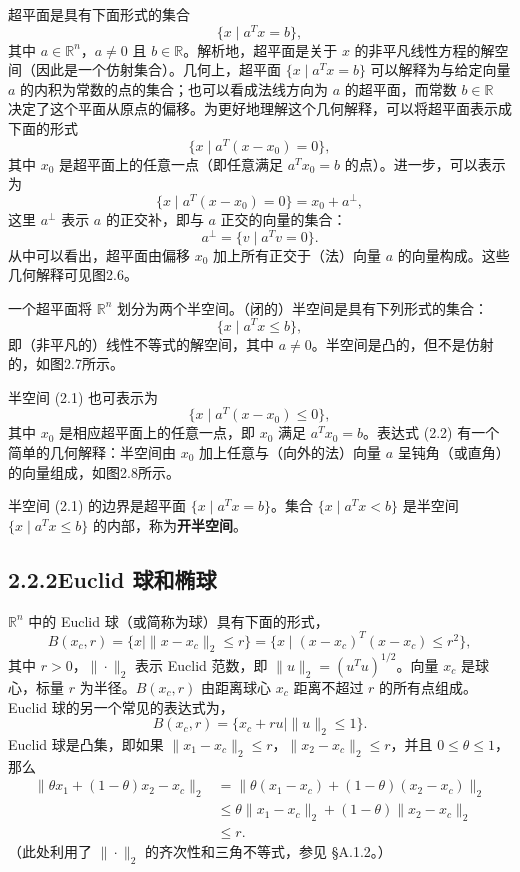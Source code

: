 \documentclass[UTF8,12pt,a4paper,fontset=fandol]{ctexart}
\begin{document}
超平面是具有下面形式的集合
\[
  \{x\mid a^Tx=b\},
\]
其中 $a\in\mathbb{R}^n$，$a\ne 0$ 且 $b\in\mathbb{R}$。解析地，超平面是关于 $x$ 的非平凡线性方程的解空间（因此是一个仿射集合）。几何上，超平面 $\{x\mid a^Tx=b\}$ 可以解释为与给定向量 $a$ 的内积为常数的点的集合；也可以看成法线方向为 $a$ 的超平面，而常数 $b\in\mathbb{R}$ 决定了这个平面从原点的偏移。为更好地理解这个几何解释，可以将超平面表示成下面的形式
\[
  \{x\mid a^T(x-x_0)=0\},
\]
其中 $x_0$ 是超平面上的任意一点（即任意满足 $a^Tx_0=b$ 的点）。进一步，可以表示为
\[
  \{x\mid a^T(x-x_0)=0\}=x_0+a^\perp,
\]
这里 $a^\perp$ 表示 $a$ 的正交补，即与 $a$ 正交的向量的集合：
\[
  a^\perp=\{v\mid a^Tv=0\}.
\]
从中可以看出，超平面由偏移 $x_0$ 加上所有正交于（法）向量 $a$ 的向量构成。这些几何解释可见图2.6。

一个超平面将 $\mathbb{R}^n$ 划分为两个半空间。（闭的）半空间是具有下列形式的集合：
\begin{equation}
  \{x\mid a^Tx\le b\},
  \tag{2.1}
\end{equation}
即（非平凡的）线性不等式的解空间，其中 $a\ne 0$。半空间是凸的，但不是仿射的，如图2.7所示。

半空间 (2.1) 也可表示为
\begin{equation}
  \{x\mid a^T(x-x_0)\le 0\},
  \tag{2.2}
\end{equation}
其中 $x_0$ 是相应超平面上的任意一点，即 $x_0$ 满足 $a^Tx_0=b$。表达式 (2.2) 有一个简单的几何解释：半空间由 $x_0$ 加上任意与（向外的法）向量 $a$ 呈钝角（或直角）的向量组成，如图2.8所示。

半空间 (2.1) 的边界是超平面 $\{x\mid a^Tx=b\}$。集合 $\{x\mid a^Tx<b\}$ 是半空间 $\{x\mid a^Tx\le b\}$ 的内部，称为\textbf{开半空间}。

\subsection*{2.2.2\quad Euclid 球和椭球}

$\mathbb{R}^n$ 中的 Euclid 球（或简称为球）具有下面的形式，
\[
  B(x_c,r)=\{x\mid \|x-x_c\|_2\le r\}
  =\{x\mid (x-x_c)^T(x-x_c)\le r^2\},
\]
其中 $r>0$，$\|\cdot\|_2$ 表示 Euclid 范数，即 $\|u\|_2=(u^Tu)^{1/2}$。向量 $x_c$ 是球心，标量 $r$ 为半径。$B(x_c,r)$ 由距离球心 $x_c$ 距离不超过 $r$ 的所有点组成。Euclid 球的另一个常见的表达式为，
\[
  B(x_c,r)=\{x_c+ru\mid \|u\|_2\le 1\}.
\]
Euclid 球是凸集，即如果 $\|x_1-x_c\|_2\le r$，$\|x_2-x_c\|_2\le r$，并且 $0\le\theta\le 1$，那么
\[
\begin{aligned}
  \|\theta x_1+(1-\theta)x_2-x_c\|_2
  &=\|\theta(x_1-x_c)+(1-\theta)(x_2-x_c)\|_2\\
  &\le \theta\|x_1-x_c\|_2+(1-\theta)\|x_2-x_c\|_2\\
  &\le r.
\end{aligned}
\]
（此处利用了 $\|\cdot\|_2$ 的齐次性和三角不等式，参见 §A.1.2。）
\end{document}
